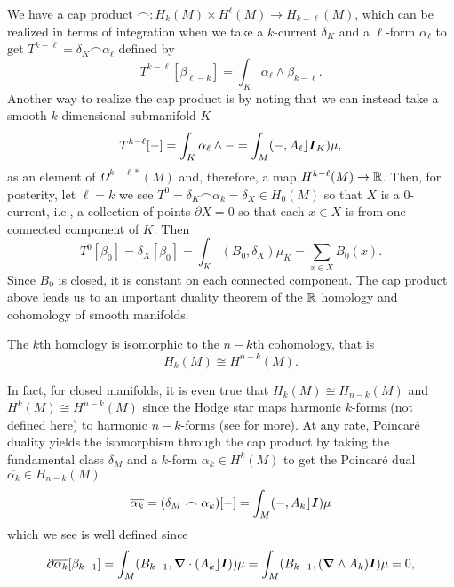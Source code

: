 \documentclass[conf]{new-aiaa}
\begin{document}
We have a cap product $\frown \colon H_k(M)\times H^\ell(M) \to H_{k-\ell}(M)$, which can be realized in terms of integration when we take a $k$-current $\delta_K$ and a $\ell$-form $\alpha_\ell$ to get $T^{k-\ell} = \delta_K \frown  \alpha_\ell$ defined by
\begin{equation}
T^{k-\ell}[\beta_{\ell - k}] = \int_{K} \alpha_\ell \wedge \beta_{k-\ell}.
\end{equation}
Another way to realize the cap product is by noting that we can instead take a smooth $k$-dimensional submanifold $K$
\begin{equation}
T^{k-\ell}[-] = \int_K \alpha_\ell \wedge - = \int_M (-,A_\ell \rfloor \boldsymbol{I}_K) \mu,
\end{equation}
as an element of $\Omega^{k-\ell*}(M)$ and, therefore, a map $H^{k-\ell}(M)\to \mathbb{R}$. Then, for posterity, let $\ell = k$ we see $T^0 = \delta_K \frown \alpha_k = \delta_{X} \in H_0(M)$ so that $X$ is a $0$-current, i.e., a collection of points $\partial X = 0$ so that each $x\in X$ is from one connected component of $K$. Then
\begin{equation}
T^0[\beta_0] = \delta_{X}[\beta_0] = \int_{K} (B_0 , \delta_X ) \mu_{K} = \sum_{x\in X} B_0(x).
\end{equation}
Since $B_0$ is closed, it is constant on each connected component. The cap product above leads us to an important duality theorem of the $\mathbb{R}$ homology and cohomology of smooth manifolds.
\begin{theorem}
    The $k$th homology is isomorphic to the $n-k$th cohomology, that is 
\begin{equation}
H_k(M) \cong H^{n-k}(M).
\end{equation}
\end{theorem}
In fact, for closed manifolds, it is even true that $H_k(M)\cong H_{n-k}(M)$ and $H^k(M)\cong H^{n-k}(M)$ since the Hodge star maps harmonic $k$-forms (not defined here) to harmonic $n-k$-forms (see \cite{cappell_cohomology_2006} for more). At any rate, Poincar\'e duality yields the isomorphism through the cap product by taking the fundamental class $\delta_M$ and a $k$-form $\alpha_k \in H^k(M)$ to get the Poincar\'e dual $\overline{\alpha_k} \in H_{n-k}(M)$
\begin{equation}
\overline{\alpha_k} = (\delta_M \frown \alpha_k)[-] = \int_M (-,A_k \rfloor \boldsymbol{I})\mu
\end{equation}
which we see is well defined since
\begin{align}
\partial \overline{\alpha_k}[\beta_{k-1}] = \int_M (B_{k-1}, \boldsymbol{\nabla} \cdot (A_k \rfloor \boldsymbol{I}))\mu = \int_M (B_{k-1},(\boldsymbol{\nabla} \wedge A_k)\boldsymbol{I}) \mu =0,
\end{align}
\end{document}
